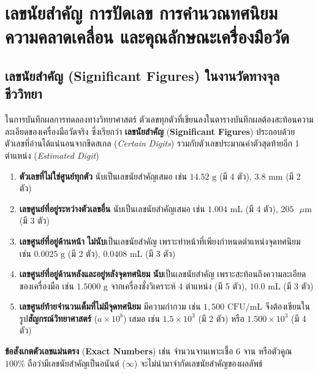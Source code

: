 \section{เลขนัยสำคัญ การปัดเลข การคำนวณทศนิยม ความคลาดเคลื่อน และคุณลักษณะเครื่องมือวัด}

\subsection{เลขนัยสำคัญ (Significant Figures) ในงานวัดทางจุลชีววิทยา}

ในการบันทึกผลการทดลองทางวิทยาศาสตร์ ตัวเลขทุกตัวที่เขียนลงในตารางบันทึกผลต้องสะท้อนความละเอียดของเครื่องมือวัดจริง ซึ่งเรียกว่า \textbf{เลขนัยสำคัญ} (\textbf{Significant Figures}) ประกอบด้วยตัวเลขที่อ่านได้แน่นอนจากขีดสเกล (\textit{Certain Digits}) รวมกับตัวเลขประมาณค่าตัวสุดท้ายอีก 1 ตำแหน่ง (\textit{Estimated Digit})

\begin{conceptbox}
\begin{enumerate}
    \item \textbf{ตัวเลขที่ไม่ใช่ศูนย์ทุกตัว} นับเป็นเลขนัยสำคัญเสมอ เช่น $14.52\text{ g}$ (มี 4 ตัว), $3.8\text{ mm}$ (มี 2 ตัว)
    \item \textbf{เลขศูนย์ที่อยู่ระหว่างตัวเลขอื่น} นับเป็นเลขนัยสำคัญเสมอ เช่น $1.004\text{ mL}$ (มี 4 ตัว), $205\text{ }\mu\text{m}$ (มี 3 ตัว)
    \item \textbf{เลขศูนย์ที่อยู่ด้านหน้า} \textbf{ไม่นับ}เป็นเลขนัยสำคัญ เพราะทำหน้าที่เพียงกำหนดตำแหน่งจุดทศนิยม เช่น $0.0025\text{ g}$ (มี 2 ตัว), $0.0408\text{ mL}$ (มี 3 ตัว)
    \item \textbf{เลขศูนย์ที่อยู่ด้านหลังและอยู่หลังจุดทศนิยม} \textbf{นับ}เป็นเลขนัยสำคัญ เพราะสะท้อนถึงความละเอียดของเครื่องมือ เช่น $1.5000\text{ g}$ จากเครื่องชั่งวิเคราะห์ 4 ตำแหน่ง (มี 5 ตัว), $10.0\text{ mL}$ (มี 3 ตัว)
    \item \textbf{เลขศูนย์ท้ายจำนวนเต็มที่ไม่มีจุดทศนิยม} มีความกำกวม เช่น $1{,}500\text{ CFU/mL}$ จึงต้องเขียนในรูป\textbf{สัญกรณ์วิทยาศาสตร์} ($a \times 10^b$) เสมอ เช่น $1.5 \times 10^3$ (มี 2 ตัว) หรือ $1.500 \times 10^3$ (มี 4 ตัว)
\end{enumerate}
\vspace{2pt}
\noindent\textbf{ข้อสังเกต}\quad \textbf{ตัวเลขแม่นตรง} (\textbf{Exact Numbers}) เช่น จำนวนจานเพาะเชื้อ 6 จาน หรือตัวคูณ $100\%$ ถือว่ามีเลขนัยสำคัญเป็นอนันต์ ($\infty$) จะไม่นำมาจำกัดเลขนัยสำคัญของผลลัพธ์
\end{conceptbox}

